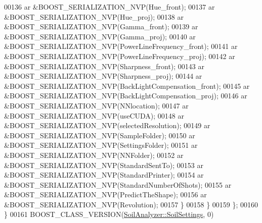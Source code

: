 \begin{DoxyCode}
00136       ar &BOOST\_SERIALIZATION\_NVP(Hue\_front);
00137       ar &BOOST\_SERIALIZATION\_NVP(Hue\_proj);
00138       ar &BOOST\_SERIALIZATION\_NVP(Gamma\_front);
00139       ar &BOOST\_SERIALIZATION\_NVP(Gamma\_proj);
00140       ar &BOOST\_SERIALIZATION\_NVP(PowerLineFrequency\_front);
00141       ar &BOOST\_SERIALIZATION\_NVP(PowerLineFrequency\_proj);
00142       ar &BOOST\_SERIALIZATION\_NVP(Sharpness\_front);
00143       ar &BOOST\_SERIALIZATION\_NVP(Sharpness\_proj);
00144       ar &BOOST\_SERIALIZATION\_NVP(BackLightCompensation\_front);
00145       ar &BOOST\_SERIALIZATION\_NVP(BackLightCompensation\_proj);
00146       ar &BOOST\_SERIALIZATION\_NVP(NNlocation);
00147       ar &BOOST\_SERIALIZATION\_NVP(useCUDA);
00148       ar &BOOST\_SERIALIZATION\_NVP(selectedResolution);
00149       ar &BOOST\_SERIALIZATION\_NVP(SampleFolder);
00150       ar &BOOST\_SERIALIZATION\_NVP(SettingsFolder);
00151       ar &BOOST\_SERIALIZATION\_NVP(NNFolder);
00152       ar &BOOST\_SERIALIZATION\_NVP(StandardSentTo);
00153       ar &BOOST\_SERIALIZATION\_NVP(StandardPrinter);
00154       ar &BOOST\_SERIALIZATION\_NVP(StandardNumberOfShots);
00155       ar &BOOST\_SERIALIZATION\_NVP(PredictTheShape);
00156       ar &BOOST\_SERIALIZATION\_NVP(Revolution);
00157     \}
00158   \}
00159 \};
00160 \}
00161 BOOST\_CLASS\_VERSION(\hyperlink{class_soil_analyzer_1_1_soil_settings}{SoilAnalyzer::SoilSettings}, 0)
\end{DoxyCode}
